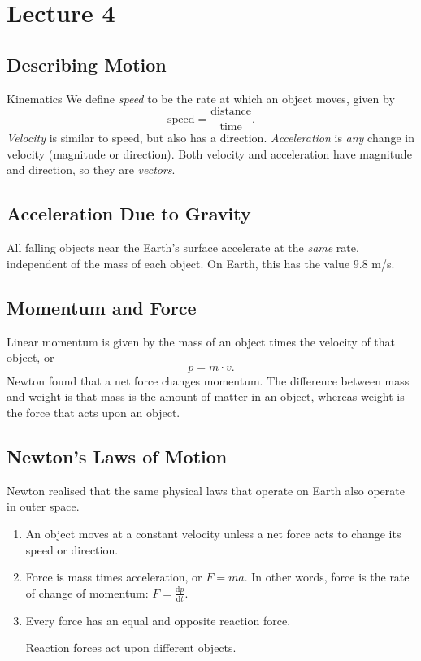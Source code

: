 \documentclass[class=article, crop=false]{standalone}
\begin{document}
  \section{Lecture 4}
  \subsection{Describing Motion}
  \begin{definition}{Kinematics}
    We define \emph{speed} to be the rate at which an object moves, given by
    \[
      \text{speed} = \frac{\text{distance}}{\text{time}}.
    \]
    \emph{Velocity} is similar to speed, but also has a direction. \emph{Acceleration} is \emph{any} change in velocity (magnitude or direction). Both velocity and acceleration have magnitude and direction, so they are \emph{vectors}.
  \end{definition}
  \subsection{Acceleration Due to Gravity}
  All falling objects near the Earth's surface accelerate at the \emph{same} rate, independent of the mass of each object. On Earth, this has the value $9.8$ m/s.
  \subsection{Momentum and Force}
  Linear momentum is given by the mass of an object times the velocity of that object, or
  \[
    p = m\cdot v.
  \]
  Newton found that a net force changes momentum. The difference between mass and weight is that mass is the amount of matter in an object, whereas weight is the force that acts upon an object.
  \subsection{Newton's Laws of Motion}
  Newton realised that the same physical laws that operate on Earth also operate in outer space.
  \begin{enumerate}
    \item An object moves at a constant velocity unless a net force acts to change its speed or direction.
    \item Force is mass times acceleration, or $F = ma$. In other words, force is the rate of change of momentum: $F = \frac{\mathrm{d}p}{\mathrm{d}t}$.
    \item Every force has an equal and opposite reaction force.
    \begin{note}{}
      Reaction forces act upon different objects.
    \end{note}
  \end{enumerate}
\end{document}
